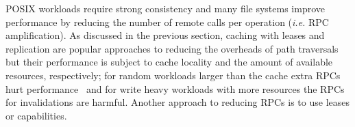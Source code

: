 %
%


POSIX workloads require strong consistency and many file systems improve
performance by reducing the number of remote calls per operation ({\it i.e.}
RPC amplification). As discussed in the previous section, caching with leases and
replication are popular approaches to reducing the overheads of path traversals
but their performance is subject to cache locality and the amount of available
resources, respectively; for random workloads larger than the cache extra RPCs
hurt performance~\cite{ren:sc2014-indexfs, weil:sc2004-dyn-metadata} and for write heavy workloads with more
resources the RPCs for invalidations are harmful. Another approach to reducing
RPCs is to use leases or capabilities.  


